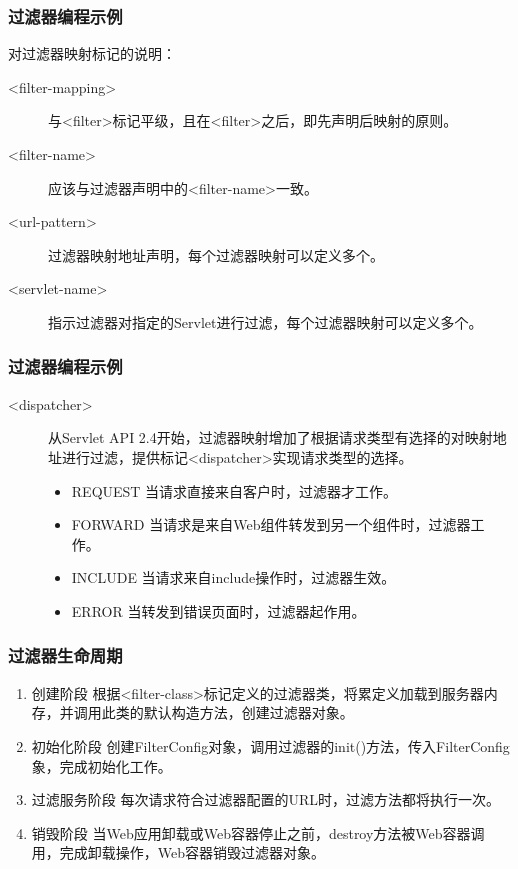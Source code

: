 \begin{frame}[fragile] %
\frametitle{过滤器编程示例} 

对过滤器映射标记的说明：

\begin{description}
\item[<filter-mapping>] 与<filter>标记平级，且在<filter>之后，即先声明后映射的原则。
\item[<filter-name>] 应该与过滤器声明中的<filter-name>一致。
\item[<url-pattern>] 过滤器映射地址声明，每个过滤器映射可以定义多个。
\item[<servlet-name>] 指示过滤器对指定的Servlet进行过滤，每个过滤器映射可以定义多个。
\end{description}
\end{frame}

\begin{frame}[fragile] %
\frametitle{过滤器编程示例} 

\begin{description}
\item[<dispatcher>] 
从Servlet API 2.4开始，过滤器映射增加了根据请求类型有选择的对映射地址进行过滤，提供标记<dispatcher>实现请求类型的选择。
\begin{itemize}\kai
\item REQUEST 当请求直接来自客户时，过滤器才工作。
\item FORWARD 当请求是来自Web组件转发到另一个组件时，过滤器工作。
\item INCLUDE 当请求来自include操作时，过滤器生效。
\item ERROR 当转发到错误页面时，过滤器起作用。
\end{itemize}
\end{description}
\end{frame}

\begin{frame}[fragile] %
\frametitle{过滤器生命周期} 

\begin{enumerate}\kai
\item {\hei\Blue 创建阶段} 根据<filter-class>标记定义的过滤器类，将累定义加载到服务器内存，并调用此类的默认构造方法，创建过滤器对象。
\item {\hei\Blue 初始化阶段} 创建FilterConfig对象，调用过滤器的init()方法，传入FilterConfig象，完成初始化工作。
\item {\hei\Blue 过滤服务阶段} 每次请求符合过滤器配置的URL时，过滤方法都将执行一次。
\item {\hei\Blue 销毁阶段} 当Web应用卸载或Web容器停止之前，destroy方法被Web容器调用，完成卸载操作，Web容器销毁过滤器对象。
\end{enumerate}
\end{frame}

